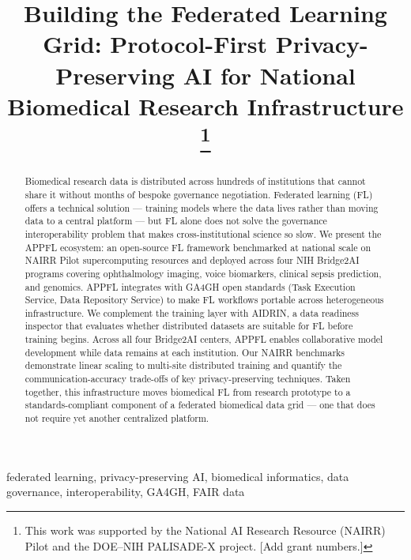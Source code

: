 \documentclass[conference]{IEEEtran}
\begin{document}
\title{Building the Federated Learning Grid: Protocol-First Privacy-Preserving AI for National Biomedical Research Infrastructure%
\thanks{This work was supported by the National AI Research Resource (NAIRR) Pilot and the DOE--NIH PALISADE-X project. [Add grant numbers.]}
}

\author{
}

\maketitle

\begin{abstract}
Biomedical research data is distributed across hundreds of institutions that cannot share it without months of bespoke governance negotiation. Federated learning (FL) offers a technical solution — training models where the data lives rather than moving data to a central platform — but FL alone does not solve the governance interoperability problem that makes cross-institutional science so slow. We present the APPFL ecosystem: an open-source FL framework benchmarked at national scale on NAIRR Pilot supercomputing resources and deployed across four NIH Bridge2AI programs covering ophthalmology imaging, voice biomarkers, clinical sepsis prediction, and genomics. APPFL integrates with GA4GH open standards (Task Execution Service, Data Repository Service) to make FL workflows portable across heterogeneous infrastructure. We complement the training layer with AIDRIN, a data readiness inspector that evaluates whether distributed datasets are suitable for FL before training begins. Across all four Bridge2AI centers, APPFL enables collaborative model development while data remains at each institution. Our NAIRR benchmarks demonstrate linear scaling to multi-site distributed training and quantify the communication-accuracy trade-offs of key privacy-preserving techniques. Taken together, this infrastructure moves biomedical FL from research prototype to a standards-compliant component of a federated biomedical data grid — one that does not require yet another centralized platform.
\end{abstract}

\begin{IEEEkeywords}
federated learning, privacy-preserving AI, biomedical informatics, data governance, interoperability, GA4GH, FAIR data
\end{IEEEkeywords}
\end{document}
